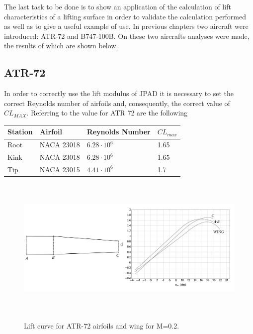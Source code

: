 The last task to be done is to show an application of the calculation of lift characteristics of a lifting surface in order to validate the calculation performed as well as to give a useful example of use. In previous chapters two aircraft were introduced: ATR-72 and B747-100B. On these two aircrafts analyses were made, the results of which are shown below.\\

\subsection{ATR-72}

In order to correctly use the lift modulus of JPAD it is necessary to set the correct Reynolds number of airfoils and, consequently, the correct value of $CL_{MAX}$. Referring to \cite{Abbott} the value for ATR 72 are the following

\begin{center}
	\begin{tabular}{ | l | l | l | l |}
		\hline
		Station & Airfoil & Reynolds Number & $CL_{max}$ \\ \hline
		Root & NACA 23018 & $6.28 \cdot 10^6$ & 1.65 \\ \hline
		Kink & NACA 23018 &  $6.28 \cdot 10^6$ & 1.65 \\ \hline
		Tip & NACA 23015 & $4.41 \cdot 10^6$ & 1.7 \\
		\hline
	\end{tabular}
\end{center}


\begin{figure}[H]
	\centering
	{\includegraphics[height=6.8cm]{Immagini/ATR_Topview.pdf}} 
	\caption{Lift curve for ATR-72 airfoils and wing for M=0.2.}
	\label{fig:clalf}
\end{figure}

